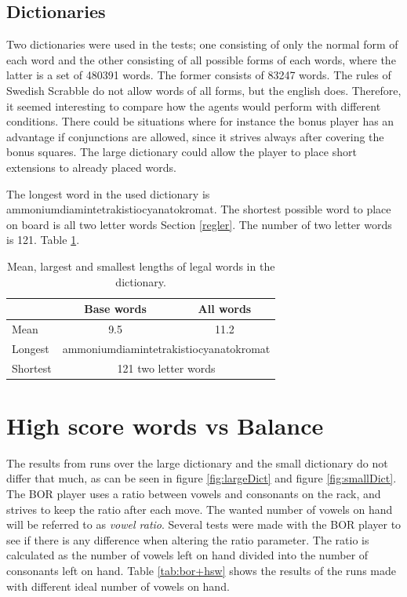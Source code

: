 \documentclass[a4paper, 12pt]{report}
\begin{document}
\subsection{Dictionaries}
Two dictionaries were used in the tests; one consisting of only the normal form of each word and the other consisting of all possible forms of each words, where the latter is a set of 480391 words. The former consists of 83247 words. The rules of Swedish Scrabble do not allow words of all forms, but the english does. Therefore, it seemed interesting to compare how the agents would perform with different conditions. There could be situations where for instance the bonus player has an advantage if conjunctions are allowed, since it strives always after covering the bonus squares. The large dictionary could allow the player to place short extensions to already placed words.

The longest word in the used dictionary is ammoniumdiamintetrakistiocyanatokromat. The shortest possible word to place on board is all two letter words Section \ref{regler}. The number of two letter words is 121. Table \ref{table:dictionary+length}.
\begin{table}[h]
\centering
	\begin{tabular}{l | c | c}
	& Base words & All words \\
	\hline
	Mean & 9.5 & 11.2 \\
	\hline
	Longest & \multicolumn{2}{c}{ammoniumdiamintetrakistiocyanatokromat} \\
	\hline
	Shortest & \multicolumn{2}{c}{121 two letter words} \\ 
	\end{tabular}
\caption{Mean, largest and smallest lengths of legal words in the dictionary.}
\label{table:dictionary+length}
\end{table}

\section{High score words vs Balance}
\label{sec:highBalance}

The results from runs over the large dictionary and the small dictionary do not differ that much, as can be seen in figure \ref{fig:largeDict} and figure \ref{fig:smallDict}.
The BOR player uses a ratio between vowels and consonants on the rack, and strives to keep the ratio after each move. The wanted number of vowels on hand will be referred to as \emph{vowel ratio}. Several tests were made with the BOR player to see if there is any difference when altering the ratio parameter. The ratio is calculated as the number of vowels left on hand divided into the number of consonants left on hand. Table \ref{tab:bor+hsw} shows the results of the runs made with different ideal number of vowels on hand.
\end{document}

